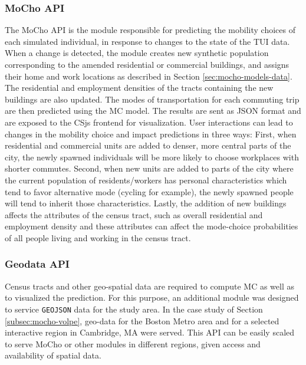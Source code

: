 {{        \subsubsection{MoCho API}\label{sec:mocho_api}
        {
            The MoCho API is the module responsible for predicting the mobility choices of each simulated individual, in response to changes to the state of the TUI data. When a change is detected, the module creates new synthetic population corresponding to the amended residential or commercial buildings, and assigns their home and work locations as described in Section \eqref{sec:mocho-models-data}. The residential and employment densities of the tracts containing the new buildings are also updated. The modes of transportation for each commuting trip are then predicted using the MC model. The results are sent as JSON format and are exposed to the CSjs frontend for visualization.
            \newline
            User interactions can lead to changes in the mobility choice and impact predictions in three ways: First, when residential and commercial units are added to denser, more central parts of the city, the newly spawned individuals will be more likely to choose workplaces with shorter commutes. Second, when new units are added to parts of the city where the current population of residents/workers has personal characteristics which tend to favor alternative mode (cycling for example), the newly spawned people will tend to inherit those characteristics. Lastly, the addition of new buildings affects the attributes of the census tract, such as overall residential and employment density and these attributes can affect the mode-choice probabilities of all people living and working in the census tract.
        }

        \subsubsection{Geodata API}
        {
            Census tracts and other geo-spatial data are required to compute MC as well as to visualized the prediction. For this purpose, an additional module was designed to service \verb|GEOJSON| data for the study area. In the case study of Section \eqref{subsec:mocho-volpe}, geo-data for the Boston Metro area and for a selected interactive region in Cambridge, MA were served. This API can be easily scaled to serve MoCho or other modules in different regions, given access and availability of spatial data.
        }
    }

}
